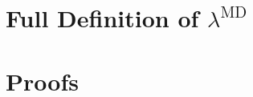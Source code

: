 \documentclass[runningheads]{llncs}
\newcommand{\LMD}{$\lambda^{\textrm{MD}}$\xspace}
\begin{document}
\iffullversion
\appendix

\newtheorem{dfn}{Definition}
\newtheorem{ex}{Example}
\newtheorem{cm}{Comment}
\newcommand{\figheader}[2]{
  \begin{flushleft}
    #2 {\bf \normalsize #1}
\end{flushleft}}

\newpage
\section{Full Definition of \LMD}


\section{Proofs}


\fi
\end{document}
